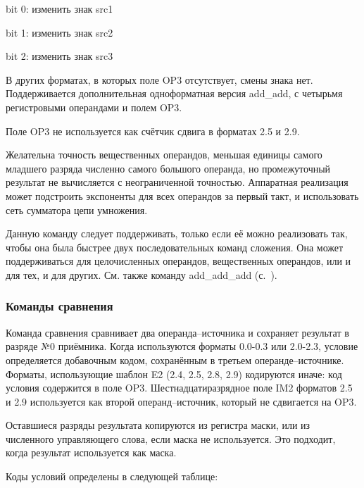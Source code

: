 \documentclass[forwardcom.tex]{subfiles}
\begin{document}
bit 0: изменить знак src1

bit 1: изменить знак src2

bit 2: изменить знак src3

В других форматах, в которых поле OP3 отсутствует, смены знака нет. Поддерживается дополнительная одноформатная версия add\_add, с четырьмя регистровыми операндами и полем OP3. 

Поле OP3 не используется как счётчик сдвига в форматах 2.5 и 2.9.

Желательна точность вещественных операндов, меньшая единицы самого младшего разряда численно самого большого операнда, но промежуточный результат не вычисляется с неограниченной точностью. Аппаратная реализация может подстроить экспоненты для всех операндов за первый такт, и использовать сеть сумматора цепи умножения.

Данную команду следует поддерживать, только если её можно реализовать так, чтобы она была быстрее двух последовательных команд сложения. Она может поддерживаться для целочисленных операндов, вещественных операндов, или и для тех, и для других. См. также команду add\_add\_add (с.~\pageref{addAddAdd}).

\subsubsection{Команды сравнения}
Команда сравнения сравнивает два операнда--источника и сохраняет результат в разряде №0 приёмника. Когда используются форматы 0.0-0.3 или 2.0-2.3, условие определяется добавочным кодом, сохранённым в третьем операнде--источнике. Форматы, использующие шаблон E2 (2.4, 2.5, 2.8, 2.9) кодируются иначе: код условия содержится в поле OP3. Шестнадцатиразрядное поле IM2 форматов  2.5 и 2.9 используется как второй операнд--источник, который не сдвигается на  OP3.

Оставшиеся разряды результата копируются из регистра маски, или из численного управляющего слова, если маска не используется. Это подходит, когда результат используется как маска.

Коды условий определены в следующей таблице:
\end{document}
